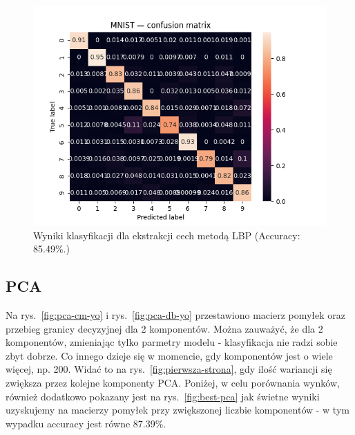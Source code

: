 \documentclass[10pt]{article}
\begin{document}
\begin{figure}[H]
    \centering
    \includegraphics[width=.5\linewidth]{img/LBP/img}
    \caption{Wyniki klasyfikacji dla ekstrakcji cech metodą LBP (Accuracy: 85.49\%.)}\label{fig:lbp-cm}
\end{figure}

\subsection*{PCA}
Na rys.~\ref{fig:pca-cm-yo} i rys.~\ref{fig:pca-db-yo}  przestawiono macierz pomyłek oraz przebieg granicy decyzyjnej dla 2 komponentów.
Można zauważyć, że dla 2 komponentów, zmieniając tylko parmetry modelu - klasyfikacja nie radzi sobie zbyt dobrze. Co innego dzieje się w momencie,
gdy komponentów jest o wiele więcej, np. 200. Widać to na rys.~\ref{fig:pierwsza-strona}, gdy ilość wariancji się zwiększa przez kolejne komponenty PCA.
Poniżej, w celu porównania wynków, również dodatkowo pokazany jest na rys.~\ref{fig:best-pca} jak świetne wyniki uzyskujemy na macierzy pomyłek
przy zwiększonej liczbie komponentów - w tym wypadku accuracy jest równe 87.39\%.
\end{document}
